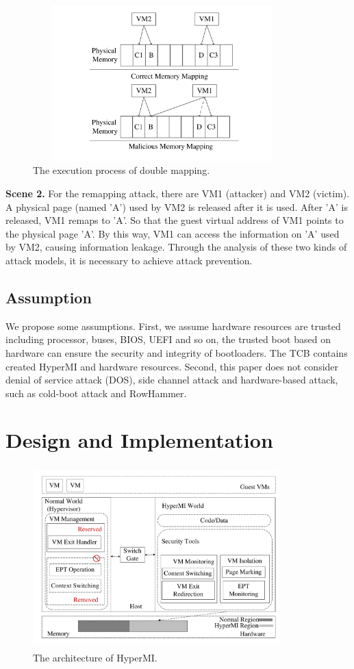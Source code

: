\documentclass[conference]{IEEEtran}
\begin{document}
\begin{figure}
\centerline{\includegraphics[width=10cm, height=6cm]{pdfvmcs.pdf}}%
\caption{The execution process of double mapping. } \label{fig0}
\end{figure}

\textbf{Scene 2.}
    For the remapping attack, there are VM1 (attacker) and VM2 (victim). A physical page (named 'A') used by VM2 is released after it is used. After 'A' is released, VM1 remaps to 'A'. So that the guest virtual address of VM1 points to the physical page 'A'. By this way, VM1 can access the information on 'A' used by VM2, causing information leakage.
Through the analysis of these two kinds of attack models, it is necessary to achieve attack prevention.
\subsection{Assumption}

We propose some assumptions.
First, we assume hardware resources are trusted including processor, buses, BIOS, UEFI and so on, the trusted boot based on hardware can ensure the security and integrity of bootloaders. The TCB contains created HyperMI and hardware resources. Second, this paper does not consider denial of service attack (DOS), side channel attack and hardware-based attack, such as cold-boot attack and RowHammer.


\section{Design and Implementation}\label{sec:design}



\begin{figure}
\centerline{\includegraphics[width=9.5cm, height=7cm]{pdfvmcs1.pdf}}%
\caption{The architecture of HyperMI. } \label{fig1}
\end{figure}
\end{document}
